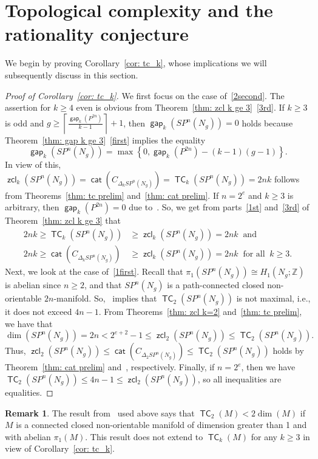 \documentclass[amscd,amssymb,verbatim,10pt]{amsart}
\numberwithin{equation}{section}
\theoremstyle{plain}
\theoremstyle{definition}
\newtheorem{remark}[thm]{Remark}
\DeclareMathOperator{\cat}{{\mathsf{cat}}}
\DeclareMathOperator{\TC}{{\mathsf{TC}}}
\DeclareMathOperator{\zcl}{{\mathsf{zcl}}}
\DeclareMathOperator{\gap}{{\mathsf{gap}}}
\def\Z{{\mathbb Z}}
\begin{document}
\section{Topological complexity and the rationality conjecture}\label{sec: observations2}

We begin by proving Corollary~\ref{cor: tc_k}, whose implications we will subsequently discuss in this section.

\begin{proof}[Proof of Corollary~\ref{cor: tc_k}]
We first focus on the case of~\eqref{2second}. The assertion for $k\ge 4$ even is obvious from Theorem~\ref{thm: zcl k ge 3}~\eqref{3rd}. If $k\ge 3$ is odd and $g\ge \left\lceil\tfrac{\gap_k(P^{2n})}{k-1}\right\rceil+1$, then $\gap_k(SP^n(N_g))=0$ holds because Theorem~\ref{thm: gap k ge 3}~\eqref{first} implies the equality 
\[
\gap_k(SP^n(N_g))=\max\left\{0,\gap_k(P^{2n})-(k-1)(g-1)\right\}.
\] 
In view of this, $\zcl_k(SP^n(N_g))=\cat(C_{\Delta_kSP^n(N_g)})=\TC_k(SP^n(N_g))=2nk$ follows from Theorems~\ref{thm: tc prelim} and~\ref{thm: cat prelim}. If $n=2^e$ and $k\ge 3$ is arbitrary, then $\gap_k(P^{2n})=0$ due to~\cite{Dav}. So, we get from parts~\eqref{1st} and~\eqref{3rd} of Theorem~\ref{thm: zcl k ge 3} that
\begin{align*}
    2nk\ge \TC_k(SP^n(N_g)) & \ge \zcl_k(SP^n(N_g))=2nk \ \text{ and} 
    \\
    2nk\ge \cat(C_{\Delta_kSP^n(N_g)}) & \ge \zcl_k(SP^n(N_g))=2nk \ \text{ for all } \ k\ge 3.
\end{align*}
Next, we look at the case of~\eqref{1first}. Recall that $\pi_1(SP^n(N_g))\cong H_1(N_g;\Z)$ is abelian since $n\ge 2$, and that $SP^n(N_g)$ is a path-connected closed non-orientable $2n$-manifold. So,~\cite[Theorem~1.2]{CV2} implies that $\TC_2(SP^n(N_g))$ is not maximal, i.e., it does not exceed $4n-1$. From Theorems~\ref{thm: zcl k=2} and~\ref{thm: tc prelim}, we have that 
\begin{equation}\label{dimvsTC}
\dim(SP^n(N_g))=2n<2^{e+2}-1\le\zcl_2(SP^n(N_g))\le\TC_2(SP^n(N_g)).
\end{equation}
Thus, $\zcl_2(SP^n(N_g))\le \cat(C_{\Delta_2SP^n(N_g)})\le \TC_2(SP^n(N_g))$ holds by Theorem~\ref{thm: cat prelim} and~\cite[Theorem~10~(2)]{GV}, respectively. Finally, if $n=2^e$, then we have $\TC_2(SP^n(N_g))\le 4n-1\le\zcl_2(SP^n(N_g))$, so all inequalities are equalities.
\end{proof}


\begin{remark}
    The result from~\cite{CV2} used above says that $\TC_2(M)<2\dim(M)$ if $M$ is a connected closed non-orientable manifold of dimension greater than 1 and with abelian $\pi_1(M)$. This result does not extend to $\TC_k(M)$ for any $k\ge 3$ in view of Corollary~\ref{cor: tc_k}. 
\end{remark}
\end{document}
